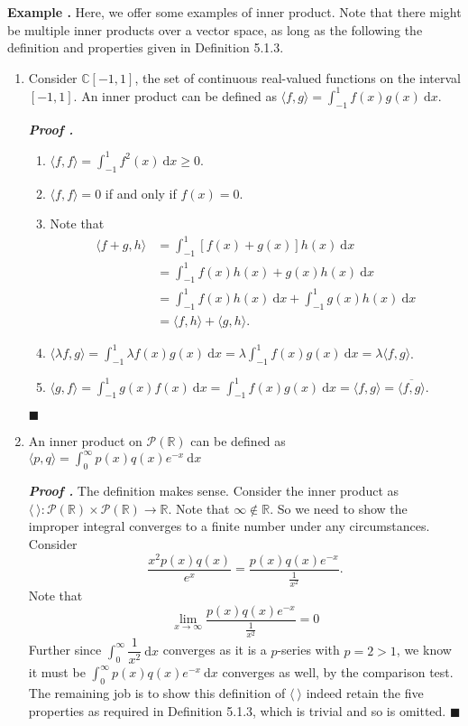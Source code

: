 \documentclass[11pt, letterpaper]{article}
\newcounter{index}[subsection]
\newenvironment*{eg}{\begin{framed}\par\noindent\textbf{Example \thesubsection.\stepcounter{index}\theindex}}{\par\end{framed}}
\newcounter{nprf}[subsection]
\newenvironment*{prf}{\par\indent\textbf{\textit{Proof \stepcounter{nprf}\thenprf.}}}{\hfill$\blacksquare$\par}
\def\dsst{\displaystyle}
\def\R{\mathbb{R}}
\def\C{\mathbb{C}}
\def\d{\mathrm{d}}
\def\P{\mathcal{P}}
\begin{document}
\begin{eg}
	Here, we offer some examples of inner product. Note that there might be multiple inner products over a vector space, as long as the following the definition and properties given in Definition 5.1.3.
	\begin{enumerate}
		\item Consider $\C[-1,1]$, the set of continuous real-valued functions on the interval $[-1,1]$. An inner product can be defined as $\langle f,g\rangle=\dsst\int_{-1}^1f(x)g(x)\ \d x$.
		\begin{prf}
			\begin{enumerate}
				\item $\langle f,f\rangle=\dsst\int_{-1}^1f^2(x)\ \d x\geq0.$
				\item $\langle f, f\rangle=0$ if and only if $f(x)=0$.
				\item Note that \[\begin{aligned}\langle f+g,h\rangle&=\dsst\int_{-1}^1[f(x)+g(x)]h(x)\ \d x\\&=\dsst\int_{-1}^1f(x)h(x)+g(x)h(x)\ \d x\\&=\dsst\int_{-1}^1f(x)h(x)\ \d x+\int_{-1}^1g(x)h(x)\ \d x\\&=\langle f,h\rangle+\langle g,h\rangle.\end{aligned}\]
				\item $\langle\lambda f,g\rangle=\dsst\int_{-1}^1\lambda f(x)g(x)\ \d x=\lambda\int_{-1}^1f(x)g(x)\ \d x=\lambda\langle f,g\rangle$.
				\item $\langle g,f\rangle=\dsst\int_{-1}^1g(x)f(x)\ \d x=\int_{-1}^1f(x)g(x)\ \d x=\langle f,g\rangle=\overline{\langle f,g\rangle}$.
			\end{enumerate}	
		\end{prf}
		\item An inner product on $\P(\R)$ can be defined as $\langle p,q\rangle=\dsst\int_0^\infty p(x)q(x)e^{-x}\ \d x$
		\begin{prf}
			The definition makes sense. Consider the inner product as $\langle\ \rangle:\P(\R)\times\P(\R)\to\R$. Note that $\infty\notin\R$. So we need to show the improper integral converges to a finite number under any circumstances. Consider \[\dfrac{x^2p(x)q(x)}{e^x}=\dfrac{p(x)q(x)e^{-x}}{\frac{1}{x^2}}.\] Note that \[\lim_{x\to\infty}\dfrac{p(x)q(x)e^{-x}}{\frac{1}{x^2}}=0\] Further since $\dsst\int_0^\infty\dfrac{1}{x^2}\ \d x$ converges as it is a $p$-series with $p=2>1$, we know it must be $\dsst\int_0^\infty p(x)q(x)e^{-x}\ \d x$ converges as well, by the comparison test. The remaining job is to show this definition of $\langle\ \rangle$ indeed retain the five properties as required in Definition 5.1.3, which is trivial and so is omitted. 
		\end{prf}
	\end{enumerate}	
\end{eg}
\end{document}
